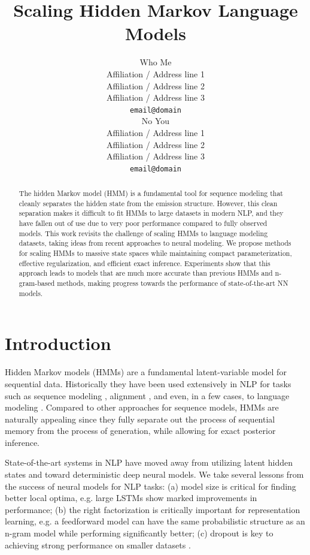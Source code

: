 \documentclass[11pt,a4paper]{article}
\title{Scaling Hidden Markov Language Models}
\author{Who Me \\
  Affiliation / Address line 1 \\
  Affiliation / Address line 2 \\
  Affiliation / Address line 3 \\
  \texttt{email@domain} \\\And
  No You \\
  Affiliation / Address line 1 \\
  Affiliation / Address line 2 \\
  Affiliation / Address line 3 \\
  \texttt{email@domain} \\}
\date{}
\begin{document}
\maketitle
\begin{abstract}
The hidden Markov model (HMM) is a fundamental tool for sequence modeling that 
cleanly separates the hidden state from the emission structure.
However, this clean separation makes it difficult to fit HMMs to large datasets in modern NLP, 
and they have fallen out of use due to very poor performance 
compared to fully observed models. This work revisits the challenge of 
scaling HMMs to language modeling datasets, taking ideas from recent approaches to neural modeling.
We propose methods for scaling HMMs to massive state spaces
while maintaining compact parameterization,
effective regularization, and efficient exact inference.
Experiments show that this approach leads to models that are much more accurate
than previous HMMs and n-gram-based methods,
making progress towards the performance of state-of-the-art NN models. 
\end{abstract}

\section{Introduction}

Hidden Markov models (HMMs) are a fundamental latent-variable model for sequential data.
Historically they have been used extensively in NLP for tasks such as
sequence modeling \citep{rabiner1990tut}, alignment \citep{vogel1996hmm},
and even, in a few cases, to language modeling \citep{kuhn1994hmmlm,huang2011thesis}. 
Compared to other approaches for sequence models, HMMs are naturally appealing since they 
fully separate out the process of sequential memory from the process of generation,
while allowing for exact posterior inference. 



State-of-the-art systems in NLP have moved away from utilizing latent hidden states
and toward deterministic deep neural models.
We take several lessons from the success of neural models for NLP tasks:
(a) model size is critical for finding better local optima,
e.g. large LSTMs \cite{zaremba2014lstm} show marked improvements in performance;
(b) the right factorization is critically important for representation learning,
e.g. a feedforward model \cite{bengio2003nlm}
can have the same probabilistic structure as an n-gram model while performing significantly better;
(c) dropout is key to achieving strong performance on smaller datasets \citep{zaremba2014lstm,merity2017awdlstm}.
\end{document}
